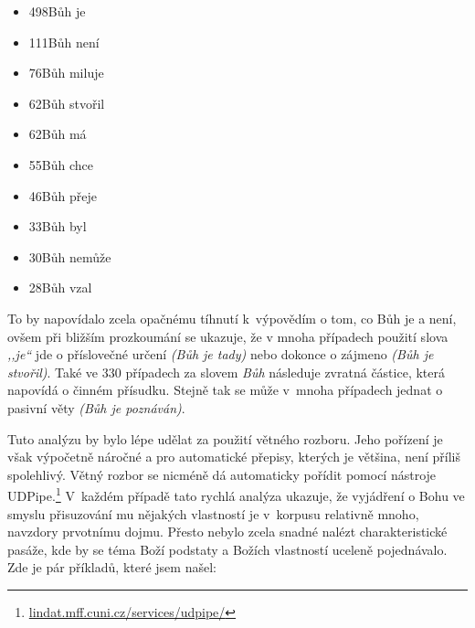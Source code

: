 \begin{itemize}
\item{498\texttimes Bůh je}
\item{111\texttimes Bůh není}
\item{ 76\texttimes Bůh miluje}
\item{ 62\texttimes Bůh stvořil}
\item{ 62\texttimes Bůh má}
\item{ 55\texttimes Bůh chce}
\item{ 46\texttimes Bůh přeje}
\item{ 33\texttimes Bůh byl}
\item{ 30\texttimes Bůh nemůže}
\item{ 28\texttimes Bůh vzal}
\end{itemize}

To by napovídalo zcela opačnému tíhnutí k~výpovědím o tom, co Bůh je a není,
ovšem při bližším prozkoumání se ukazuje, že v mnoha případech použití slova
\textit{,,je``} jde o příslovečné určení \textit{(Bůh je tady)} nebo dokonce o
zájmeno \textit{(Bůh je stvořil)}. Také ve 330 případech za slovem \textit{Bůh}
následuje zvratná částice, která napovídá o činném přísudku. Stejně tak se může
v~mnoha případech jednat o pasivní věty \textit{(Bůh je poznáván)}.

Tuto analýzu by bylo lépe udělat za použití větného rozboru. Jeho pořízení
je však výpočetně náročné a pro automatické přepisy, kterých je většina, není příliš
spolehlivý. Větný rozbor se nicméně dá automaticky pořídit pomocí nástroje UDPipe.\cite{udpipe}\footnote{%
\href{https://lindat.mff.cuni.cz/services/udpipe/}{lindat.mff.cuni.cz/services/udpipe/}} V~každém případě tato rychlá
analýza ukazuje, že vyjádření o Bohu ve smyslu přisuzování mu nějakých
vlastností je v~korpusu relativně mnoho, navzdory prvotnímu dojmu. Přesto nebylo
zcela snadné nalézt charakteristické pasáže, kde by se téma Boží podstaty a Božích
vlastností uceleně pojednávalo. Zde je pár příkladů, které jsem našel:


